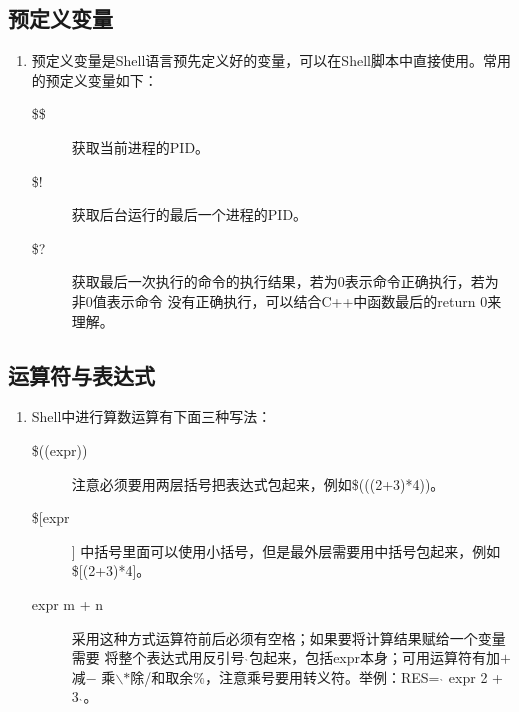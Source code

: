 \documentclass[11pt]{article}
\begin{document}
\subsection{预定义变量}
\begin{enumerate}
    \item 预定义变量是Shell语言预先定义好的变量，可以在Shell脚本中直接使用。常用的预定义变量如下：
    \begin{description}
        \item[\$\$] 获取当前进程的PID。
        \item[\$!] 获取后台运行的最后一个进程的PID。
        \item[\$?] 获取最后一次执行的命令的执行结果，若为0表示命令正确执行，若为非0值表示命令
        没有正确执行，可以结合C++中函数最后的return 0来理解。
    \end{description}
\end{enumerate}

\subsection{运算符与表达式}
\begin{enumerate}
    \item Shell中进行算数运算有下面三种写法：
    \begin{description}
        \item[\$((expr))] 注意必须要用两层括号把表达式包起来，例如\$(((2+3)*4))。
        \item[\$[expr]] 中括号里面可以使用小括号，但是最外层需要用中括号包起来，例如\$[(2+3)*4]。
        \item[expr m + n] 采用这种方式运算符前后必须有空格；如果要将计算结果赋给一个变量需要
        将整个表达式用反引号$\grave{}$ $\grave{}$包起来，包括expr本身；可用运算符有加$+$减$-$
        乘$\backslash$$*$除/和取余$\%$，注意乘号要用转义符。举例：RES=
        $\grave{}$ expr 2 + 3 $\grave{}$。
    \end{description}
\end{enumerate}
\end{document}
